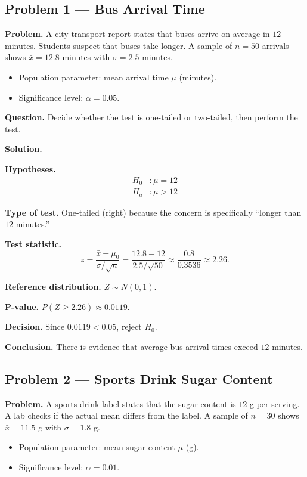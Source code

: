 	\hypertarget{c3-ex1}{}
	\subsection*{Problem 1 — Bus Arrival Time}
	
	\textbf{Problem.} A city transport report states that buses arrive on average in $12$ minutes. Students suspect that buses take longer. A sample of $n=50$ arrivals shows $\bar{x}=12.8$ minutes with $\sigma=2.5$ minutes.
	\begin{itemize}
		\item Population parameter: mean arrival time $\mu$ (minutes).
		\item Significance level: $\alpha=0.05$.
	\end{itemize}
	
	\textbf{Question.} Decide whether the test is one-tailed or two-tailed, then perform the test.
	
	\textbf{Solution.}
	
	\textbf{Hypotheses.}
	\[
	\begin{aligned}
		H_0&: \mu = 12 \\
		H_a&: \mu > 12
	\end{aligned}
	\]
	
	\textbf{Type of test.} One-tailed (right) because the concern is specifically “longer than $12$ minutes.”
	
	\textbf{Test statistic.}
	\[
	z = \frac{\bar{x}-\mu_0}{\sigma/\sqrt{n}} = \frac{12.8-12}{2.5/\sqrt{50}} \approx \frac{0.8}{0.3536} \approx 2.26.
	\]
	
	\textbf{Reference distribution.} $Z \sim N(0,1)$.
	
	\textbf{P-value.} $P(Z\ge 2.26)\approx 0.0119$.
	
	\textbf{Decision.} Since $0.0119<0.05$, reject $H_0$.
	
	\textbf{Conclusion.} There is evidence that average bus arrival times exceed $12$ minutes.
	
	\hypertarget{c3-ex2}{}
	\subsection*{Problem 2 — Sports Drink Sugar Content}
	
	\textbf{Problem.} A sports drink label states that the sugar content is $12$ g per serving. A lab checks if the actual mean differs from the label. A sample of $n=30$ shows $\bar{x}=11.5$ g with $\sigma=1.8$ g.
	\begin{itemize}
		\item Population parameter: mean sugar content $\mu$ (g).
		\item Significance level: $\alpha=0.01$.
	\end{itemize}
	
